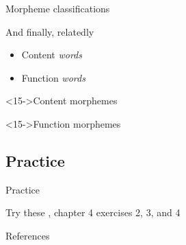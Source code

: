 \documentclass{beamer}
\newcommand{\subtwofour}{Morpheme classifications}
\newcommand{\subtwofive}{Practice}
\begin{document}
\begin{frame}{\subtwofour}
{\begin{block}{And finally, relatedly}
            \begin{itemize}
              \item Content \emph{words}
              \item Function \emph{words}
            \end{itemize}
          \end{block}
          \begin{alertblock}<15->{Content morphemes}
            
          \end{alertblock}
          \begin{alertblock}<15->{Function morphemes}
            
          \end{alertblock}
        }
      \end{frame}

    \subsection{\subtwofive}
      \begin{frame}{\subtwofive}
        \begin{block}{Try these}
          \textcite{dawson_language_2016}, chapter 4 exercises 2, 3, and 4
        \end{block}
      \end{frame}

    \begin{frame}{References}
      \printbibliography
    \end{frame}
\end{document}
